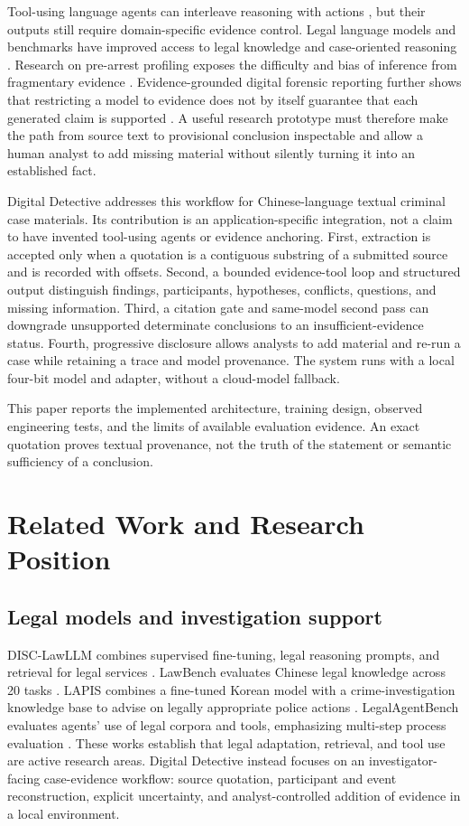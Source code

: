 \documentclass[10pt,a4paper]{article}
\begin{document}
Tool-using language agents can interleave reasoning with actions \cite{react}, but their outputs still require domain-specific evidence control. Legal language models and benchmarks have improved access to legal knowledge and case-oriented reasoning \cite{disc,lawbench,lapis,legalagentbench}. Research on pre-arrest profiling exposes the difficulty and bias of inference from fragmentary evidence \cite{beforearrest}. Evidence-grounded digital forensic reporting further shows that restricting a model to evidence does not by itself guarantee that each generated claim is supported \cite{androidforensics}. A useful research prototype must therefore make the path from source text to provisional conclusion inspectable and allow a human analyst to add missing material without silently turning it into an established fact.

Digital Detective addresses this workflow for Chinese-language textual criminal case materials. Its contribution is an application-specific integration, not a claim to have invented tool-using agents or evidence anchoring. First, extraction is accepted only when a quotation is a contiguous substring of a submitted source and is recorded with offsets. Second, a bounded evidence-tool loop and structured output distinguish findings, participants, hypotheses, conflicts, questions, and missing information. Third, a citation gate and same-model second pass can downgrade unsupported determinate conclusions to an insufficient-evidence status. Fourth, progressive disclosure allows analysts to add material and re-run a case while retaining a trace and model provenance. The system runs with a local four-bit model and adapter, without a cloud-model fallback.

This paper reports the implemented architecture, training design, observed engineering tests, and the limits of available evaluation evidence. An exact quotation proves textual provenance, not the truth of the statement or semantic sufficiency of a conclusion.

\section{Related Work and Research Position}
\subsection{Legal models and investigation support}
DISC-LawLLM combines supervised fine-tuning, legal reasoning prompts, and retrieval for legal services \cite{disc}. LawBench evaluates Chinese legal knowledge across 20 tasks \cite{lawbench}. LAPIS combines a fine-tuned Korean model with a crime-investigation knowledge base to advise on legally appropriate police actions \cite{lapis}. LegalAgentBench evaluates agents' use of legal corpora and tools, emphasizing multi-step process evaluation \cite{legalagentbench}. These works establish that legal adaptation, retrieval, and tool use are active research areas. Digital Detective instead focuses on an investigator-facing case-evidence workflow: source quotation, participant and event reconstruction, explicit uncertainty, and analyst-controlled addition of evidence in a local environment.
\end{document}
